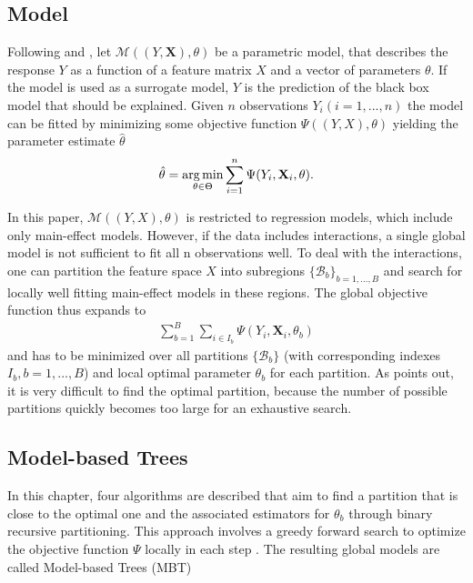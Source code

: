 \subsection{Model}
Following \citep{Zeileis.2008} and \citep{Seibold.2016}, let $\mathcal{M}((Y, \mathbf{X}), \theta)$ be a parametric model, that describes the response $Y$ as a function of a feature matrix $X$  and a vector of parameters $\theta$. If the model is used as a surrogate model, $Y$ is the prediction of the black box model that should be explained. Given $n$ observations $Y_i(i = 1,...,n)$ the model can be fitted by minimizing some objective function $\Psi((Y, X), \theta)$ yielding the parameter estimate $\hat{\theta}$
\begin{align}
    \hat{\theta} = \operatorname*{arg\,min}_{\theta \in \Theta} \sum_{i=1}^{n}\Psi(Y_{i}, \mathbf{X}_{i}, \theta).
\end{align}

In this paper, $\mathcal{M}((Y, X), \theta)$ is restricted to regression models, which include only main-effect models. However, if the data includes interactions, a single global model is not sufficient to fit all n observations well.  To deal with the interactions, one can partition the feature space $X$ into subregions $\{\mathcal{B}_b\}_{b = 1,...,B}$ and search for locally well fitting main-effect models in these regions. The global objective function thus expands to
\begin{align}
    \sum_{b=1}^B\sum_{i \in I_b}\Psi(Y_{i}, \mathbf{X}_{i}, \theta_b)
\end{align}
and has to be minimized over all partitions $\{\mathcal{B}_b\}$ (with corresponding indexes $I_b, b = 1,...,B$) and local optimal parameter $\theta_b$ for each partition. As \citep{Zeileis.2008} points out, it is very difficult to find the optimal partition, because the number of possible partitions quickly becomes too large for an exhaustive search.





\subsection{Model-based Trees}
In this chapter, four algorithms are described that aim to find a partition that is close to the optimal one and the associated estimators for $\theta_b$ through binary recursive partitioning. This approach involves a greedy forward search to optimize the objective function $\Psi$ locally in each step \citep{Zeileis.2008}.  
The resulting global models are called Model-based Trees (MBT)



